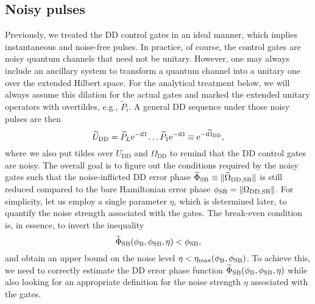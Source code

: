 \documentclass[pra,reprint,superscriptaddress]{revtex4-2}
\newcommand{\wtP}{\widetilde{P}}
\newcommand{\wtO}{\widetilde{\Omega}}
\newcommand{\wtep}{\widetilde{\Phi}_\mathrm{SB}}
\newcommand{\rDD}{\mathrm{DD}}
\newcommand{\rmax}{\mathrm{max}}
\begin{document}
\subsection{Noisy pulses}
Previously, we treated the DD control gates in an ideal manner, which implies instantaneous and noise-free pulses. In practice, of course, the control gates are noisy quantum channels that need not be unitary.
However, one may always include an ancillary system to transform a quantum channel into a unitary one over the extended Hilbert space. For the analytical treatment below, we will always assume this dilation for the actual gates and marked the extended unitary operators with overtildes, e.g., $\wtP_i$. A general DD sequence under those noisy pulses are then 
\begin{equation}\label{eq:noisy-UDD}
 \widetilde{U}_{\mathrm{DD}} =  \wtP_L \upe^{-\upi \Omega}  \ldots  \wtP_1\upe^{-\upi \Omega}\equiv  \upe^{-\upi\wtO_\rDD},
\end{equation}
where we also put tildes over $U_\rDD$ and $\Omega_\rDD$ to remind that the DD control gates are noisy. 
The overall goal is to figure out the conditions required by the noisy gates such that the noise-inflicted DD error phase $\wtep \equiv \norm{\wtO_{\rDD,\rSB}}$  is still reduced compared to the bare Hamiltonian error phase $\phi_\rSB = \norm{\Omega_{\rDD,\rSB}}$. For simplicity, let us employ a single parameter $\eta$, which is determined later,  to quantify the noise strength associated with the gates.  The break-even condition is, in essence, to invert the inequality
\begin{equation}
 \wtep(\phi_\rB,\phi_\rSB,\eta) < \phi_\rSB,
\end{equation} 
and obtain an upper bound on the noise level $\eta<\eta_{\rmax}(\phi_\rB, \phi_\rSB)$.
To achieve this, we need to correctly estimate the DD error phase function $\wtep(\phi_\rB,\phi_\rSB,\eta)$ while also looking for an appropriate definition for the noise strength $\eta$ associated with the gates.  
\end{document}
